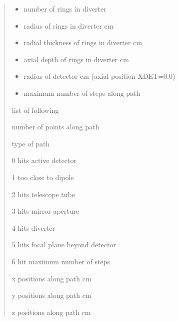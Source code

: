\documentclass[letterpaper,10pt,english]{sphinxmanual}
\begin{document}
\begin{fulllineitems}
\begin{quote}
\begin{description}
\begin{itemize}
\item {} 
 \textendash{} number of rings in diverter

\item {} 
 \textendash{} radius of rings in diverter cm

\item {} 
 \textendash{} radial thickness of rings in diverter cm

\item {} 
 \textendash{} axial depth of rings in diverter cm

\item {} 
 \textendash{} radius of detector cm (axial position XDET=0.0)

\item {} 
 \textendash{} maximum number of steps along path

\end{itemize}

\item[{Returns}] \leavevmode

\begin{DUlineblock}{0em}
\item[] list of following
\item[]
\begin{DUlineblock}{\DUlineblockindent}
\item[]   number of points along path
\item[]   type of path
\item[]
\begin{DUlineblock}{\DUlineblockindent}
\item[] 0 hits active detector
\item[] 1 too close to dipole
\item[] 2 hits telescope tube
\item[] 3 hits mirror aperture
\item[] 4 hits diverter
\item[] 5 hits focal plane beyond detector
\item[] 6 hit maximum number of steps
\end{DUlineblock}
\item[]      x positions along path cm
\item[]      y positions along path cm
\item[]      z positions along path cm
\end{DUlineblock}
\end{DUlineblock}


\end{description}\end{quote}

\end{fulllineitems}
\end{document}
